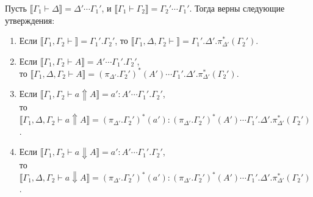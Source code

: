\documentclass{amsart}
\theoremstyle{definition}
\theoremstyle{remark}
\renewcommand{\ll}{\llbracket}
\newcommand{\rr}{\rrbracket}
\numberwithin{figure}{section}
\begin{document}
\begin{lem}
Пусть $\ll \Gamma_1 \vdash \Delta \rr = \Delta' \dotsb \Gamma_1'$, и $\ll \Gamma_1 \vdash \Gamma_2 \rr = \Gamma_2' \dotsb \Gamma_1'$.
Тогда верны следующие утверждения:
\begin{enumerate}
\item Если $\ll \Gamma_1, \Gamma_2 \vdash \rr = \Gamma_1'.\Gamma_2'$, то $\ll \Gamma_1, \Delta, \Gamma_2 \vdash \rr = \Gamma_1'.\Delta'.\pi_{\Delta'}^*(\Gamma_2')$.
\item Если $\ll \Gamma_1, \Gamma_2 \vdash A \rr = A' \dotsb \Gamma_1'.\Gamma_2'$, \\
    то $\ll \Gamma_1, \Delta, \Gamma_2 \vdash A \rr = (\pi_{\Delta'}.\Gamma_2')^*(A') \dotsb \Gamma_1'.\Delta'.\pi_{\Delta'}^*(\Gamma_2')$.
\item Если $\ll \Gamma_1, \Gamma_2 \vdash a \Uparrow A \rr = a' : A' \dotsb \Gamma_1'.\Gamma_2'$, \\
    то $\ll \Gamma_1, \Delta, \Gamma_2 \vdash a \Uparrow A \rr = (\pi_{\Delta'}.\Gamma_2')^*(a') : (\pi_{\Delta'}.\Gamma_2')^*(A') \dotsb \Gamma_1'.\Delta'.\pi_{\Delta'}^*(\Gamma_2')$.
\item Если $\ll \Gamma_1, \Gamma_2 \vdash a \Downarrow A \rr = a' : A' \dotsb \Gamma_1'.\Gamma_2'$, \\
    то $\ll \Gamma_1, \Delta, \Gamma_2 \vdash a \Downarrow A \rr = (\pi_{\Delta'}.\Gamma_2')^*(a') : (\pi_{\Delta'}.\Gamma_2')^*(A') \dotsb \Gamma_1'.\Delta'.\pi_{\Delta'}^*(\Gamma_2')$.
\end{enumerate}
\end{lem}
\end{document}
